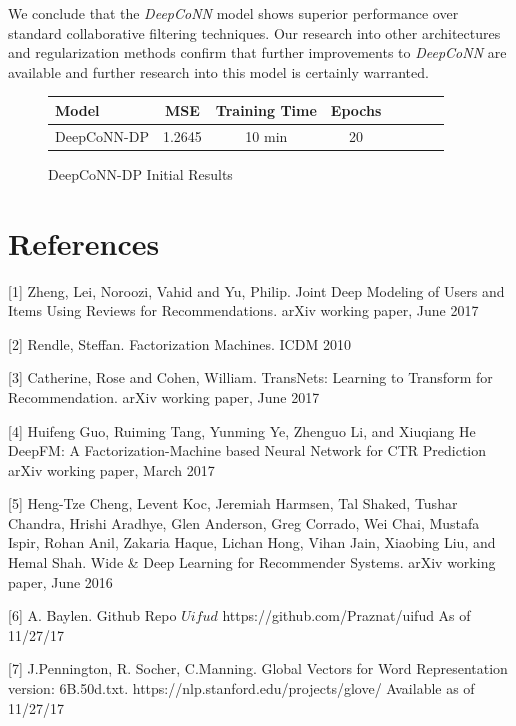 \documentclass[10pt, twocolumn, letterpaper]{article}
\begin{document}
We conclude that the \textit{DeepCoNN} model shows superior performance over standard collaborative filtering techniques. Our research into other architectures and regularization methods confirm that further improvements to \textit{DeepCoNN} are available and further research into this model is certainly warranted.






\begin{figure}[!ht]
\begin{center}
{\small
\begin{tabular}{l|ccccccc}
\hline
Model & MSE & Training Time & Epochs \\
\hline
DeepCoNN-DP & 1.2645 & 10 min & 20  \\
\hline
\end{tabular}
}
\end{center}
\caption{DeepCoNN-DP Initial Results}
\end{figure}


\section{References}

[1] Zheng, Lei, Noroozi, Vahid and Yu, Philip.
Joint Deep Modeling of Users and Items Using Reviews for Recommendations. arXiv working paper, June 2017

[2] Rendle, Steffan.
Factorization Machines. ICDM 2010

[3] Catherine, Rose and Cohen, William.
TransNets: Learning to Transform for Recommendation. arXiv working paper, June 2017

[4] Huifeng Guo, Ruiming Tang, Yunming Ye, Zhenguo Li, and Xiuqiang He
DeepFM: A Factorization-Machine based Neural Network for CTR Prediction
arXiv working paper, March 2017

[5] Heng-Tze Cheng, Levent Koc, Jeremiah Harmsen, Tal Shaked, Tushar Chandra, Hrishi Aradhye, Glen Anderson, Greg Corrado, Wei Chai, Mustafa Ispir, Rohan Anil, Zakaria Haque, Lichan Hong, Vihan Jain, Xiaobing Liu, and Hemal Shah.
Wide \& Deep Learning for Recommender Systems. arXiv working paper, June 2016

[6] A. Baylen. Github Repo $Uifud$
https://github.com/Praznat/uifud
As of 11/27/17

[7] J.Pennington, R. Socher, C.Manning.
Global Vectors for Word Representation version: 6B.50d.txt.
https://nlp.stanford.edu/projects/glove/
Available as of 11/27/17
\end{document}
